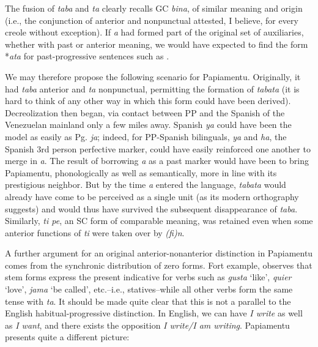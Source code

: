 \label{ex:2:98}\z

The fusion of \textit{taba} and \textit{ta} clearly recalls GC \textit{bina}, of similar meaning and origin (i.e., the conjunction of anterior and nonpunctual attested, I believe, for every creole without exception). If \textit{a} had formed part of the original set of auxiliaries, whether with past or anterior meaning, we would have expected to find the form *\textit{ata} for past-progressive sentences such as .

We may therefore propose the following scenario for Papiamentu. Originally, it had \textit{taba} anterior and \textit{ta} nonpunctual, permitting the formation of \textit{tabata} (it is hard to think of any other way in which this form could have been derived). Decreolization then began, via contact between PP and the Spanish of the Venezuelan mainland only a few miles away. Spanish \textit{ya} could have been the model as easily as Pg. \textit{ja}; indeed, for PP-Spanish bilinguals, \textit{ya} and \textit{ha}, the Spanish 3rd person perfective marker, could have easily reinforced one another to merge in \textit{a}. The result of borrowing \textit{a} as a past marker would have been to bring Papiamentu, phonologically as well as semantically, more in line with its prestigious neighbor. But by the time \textit{a} entered the language, \textit{tabata} would already have come to be perceived as a single unit (as its modern orthography suggests) and would thus have survived the subsequent disappearance of \textit{taba}. Similarly, \textit{ti pe}, an SC form of comparable meaning, was retained even when some anterior functions of \textit{ti} were taken over by \textit{(fi)n}.

A further argument for an original anterior-nonanterior distinc\-tion in Papiamentu comes from the synchronic distribution of zero forms. Fort example, \citet[107]{Goilo1953} observes that stem forms express the present indicative for verbs such as \textit{gusta} `like', \textit{quier} `love', \textit{jama} `be called', etc.--i.e., statives--while all other verbs form the same tense with \textit{ta}. It should be made quite clear that this is not a parallel to the English habitual-progressive distinction. In English, we can have \textit{I write} as well as \textit{I want}, and there exists the opposition \textit{I write/I am writing}. Papiamentu presents quite a different picture:

\z

